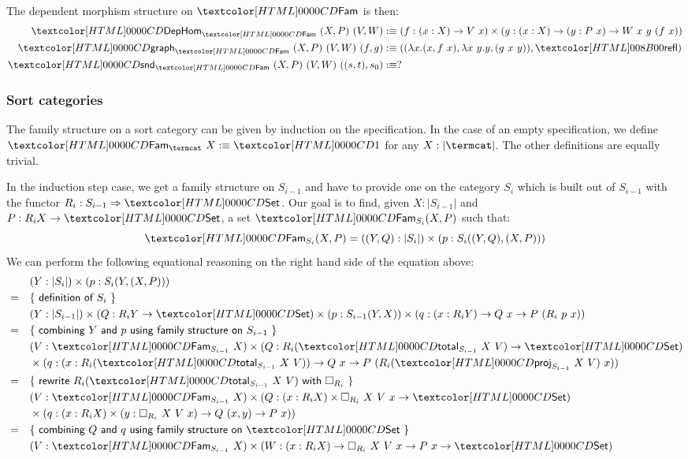 The dependent morphism structure on $\Fam$ is then:
%
\begin{align*}
  \DepHom_{\Fam}\ (X , P)\ (V , W) &\ddefeq (f : (x : X) \to V\ x) \times (g : (x : X) \to (y : P\ x) \to W\ x\ y\ (f\ x)) \\
  \grph_{\Fam}\ (X , P)\ (V , W)\ (f , g) &\ddefeq ((\lambda x . (x , f\ x) , \lambda x\ y . y , (g\ x\ y)) , \refl) \\
  \snd_{\Fam}\ (X , P)\ (V , W)\ ((s , t) , s_0) &\ddefeq ?
\end{align*}
%
\subsubsection{Sort categories}

The family structure on a sort category can be given by induction on
the specification. In the case of an empty specification, we define
$\Fam_{\termcat}\ X \ddefeq \unitty$ for any $X : | \termcat |$. The
other definitions are equally trivial.

In the induction step case, we get a family structure on $S_{i-1}$ and
have to provide one on the category $S_i$ which is built out of
$S_{i-1}$ with the functor $R_i : \Func{S_{i-1}}{\Set}$. Our goal is
to find, given $X : | S_{i-1} |$ and $P : R_i X \to \Set$, a set
$\Fam_{S_i} (X, P)$ such that:
$$
\Fam_{S_i} (X, P) = ((Y , Q) : | S_i |) \times (p : S_i((Y,Q),(X,P)))
$$
We can perform the following equational reasoning on the right hand
side of the equation above:
\begin{align*}
  &&&(Y : | S_i |) \times (p : S_i(Y,(X,P))) \\
  &=& &\reasontext{definition of $S_i$} \\
  &&&(Y : | S_{i-1} |) \times (Q : R_i Y \to \Set) \times (p : S_{i-1}(Y,X)) \times (q : (x : R_i Y) \to Q\ x \to P\ (R_i\ p\ x)) \\
  &=& &\reasontext{combining $Y$ and $p$ using family structure on $S_{i-1}$} \\
  &&&(V : \Fam_{S_{i-1}}\ X) \times (Q : R_i (\total_{S_{i-1}}\ X\ V) \to \Set) \\
  &&&\times (q : (x : R_i (\total_{S_{i-1}}\ X\ V)) \to Q\ x \to P\ (R_i (\proj_{S_{i-1}}\ X\ V)\ x)) \\
  &=& &\reasontext{rewrite $R_i (\total_{S_{i-1}}\ X\ V)$ with $\Box_{R_i}$} \\
  &&&(V : \Fam_{S_{i-1}}\ X) \times (Q : (x : R_i X) \times \Box_{R_i}\ X\ V\ x \to \Set) \\
  &&&\times (q : (x : R_i X) \times (y : \Box_{R_i}\ X\ V\ x) \to Q\ (x , y) \to P\ x)) \\
  &=& &\reasontext{combining $Q$ and $q$ using family structure on $\Set$} \\
  &&&(V : \Fam_{S_{i-1}} X) \times (W : (x : R_i X) \to \Box_{R_i}\ X\ V\ x \to P\ x \to \Set)
\end{align*}

